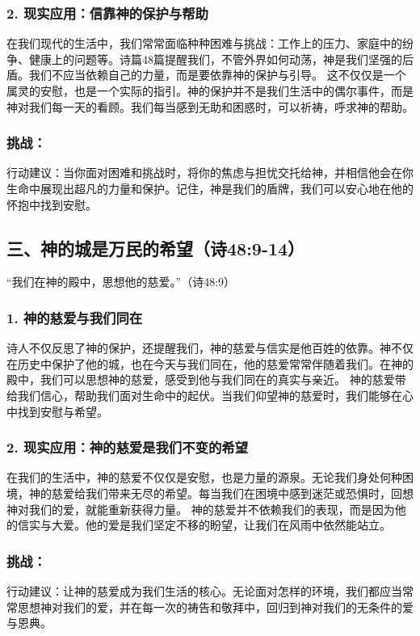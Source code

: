 \documentclass[a4paper, 12pt]{article}
\begin{document}
\subsubsection*{2. 现实应用：信靠神的保护与帮助}
在我们现代的生活中，我们常常面临种种困难与挑战：工作上的压力、家庭中的纷争、健康上的问题等。诗篇48篇提醒我们，不管外界如何动荡，神是我们坚强的后盾。我们不应当依赖自己的力量，而是要依靠神的保护与引导。
这不仅仅是一个属灵的安慰，也是一个实际的指引。神的保护并不是我们生活中的偶尔事件，而是神对我们每一天的看顾。我们每当感到无助和困惑时，可以祈祷，呼求神的帮助。
\subsubsection*{挑战：}

行动建议：当你面对困难和挑战时，将你的焦虑与担忧交托给神，并相信他会在你生命中展现出超凡的力量和保护。记住，神是我们的盾牌，我们可以安心地在他的怀抱中找到安慰。
\subsection*{三、神的城是万民的希望（诗48:9-14）}
“我们在神的殿中，思想他的慈爱。”（诗48:9）

\subsubsection*{1. 神的慈爱与我们同在}
诗人不仅反思了神的保护，还提醒我们，神的慈爱与信实是他百姓的依靠。神不仅在历史中保护了他的城，也在今天与我们同在，他的慈爱常常伴随着我们。在神的殿中，我们可以思想神的慈爱，感受到他与我们同在的真实与亲近。
神的慈爱带给我们信心，帮助我们面对生命中的起伏。当我们仰望神的慈爱时，我们能够在心中找到安慰与希望。
\subsubsection*{2. 现实应用：神的慈爱是我们不变的希望}
在我们的生活中，神的慈爱不仅仅是安慰，也是力量的源泉。无论我们身处何种困境，神的慈爱给我们带来无尽的希望。每当我们在困境中感到迷茫或恐惧时，回想神对我们的爱，就能重新获得力量。
神的慈爱并不依赖我们的表现，而是因为他的信实与大爱。他的爱是我们坚定不移的盼望，让我们在风雨中依然能站立。
\subsubsection*{挑战：}

行动建议：让神的慈爱成为我们生活的核心。无论面对怎样的环境，我们都应当常常思想神对我们的爱，并在每一次的祷告和敬拜中，回归到神对我们的无条件的爱与恩典。
\end{document}
